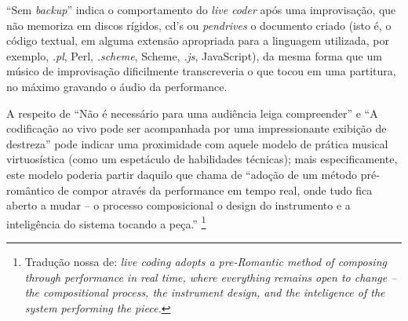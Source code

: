 ``Sem \emph{backup}'' indica o comportamento do \emph{live coder} após uma improvisação, que não memoriza em discos rígidos, cd's ou \emph{pendrives} o documento criado (isto é, o código textual, em alguma extensão apropriada para a linguagem utilizada, por exemplo, \emph{.pl}, Perl, \emph{.scheme}, Scheme, \emph{.js}, JavaScript), da mesma forma que um músico de improvisação dificilmente transcreveria o que tocou em uma partitura, no máximo gravando o áudio da performance.

A respeito de ``Não é necessário para uma audiência leiga compreender'' e ``A codificação ao vivo pode ser acompanhada por uma impressionante exibição de destreza'' pode indicar uma proximidade com aquele modelo de prática musical virtuosística (como um espetáculo de habilidades técnicas); mais especificamente, este modelo poderia partir daquilo que   chama de ``adoção de um método pré-romântico de compor através da performance em tempo real, onde tudo fica aberto a mudar -- o processo composicional o design do instrumento e a inteligência do sistema tocando a peça.'' \cite[p.~4]{magnusson_herding_2014}\footnote{Tradução nossa de: \emph{live coding adopts a pre-Romantic method of composing through performance in real time, where everything remains open to change -- the compositional process, the instrument design, and the inteligence of the system performing the piece.}}





